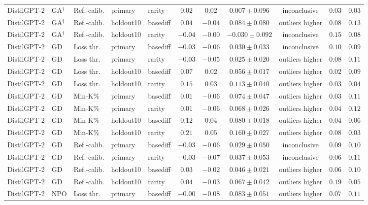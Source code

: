 {\begin{longtable}{@{\extracolsep{\fill}}lllllcccccc@{}}
DistilGPT-2 & GA$^{\dagger}$ & Ref.-calib. & primary & rarity & $0.02$ & $0.02$ & $0.007 \pm 0.096$ & inconclusive & $0.03$ & $0.03$ \\
DistilGPT-2 & GA$^{\dagger}$ & Ref.-calib. & holdout10 & basediff & $0.04$ & $-0.04$ & $0.084 \pm 0.080$ & outliers higher & $0.08$ & $0.13$ \\
DistilGPT-2 & GA$^{\dagger}$ & Ref.-calib. & holdout10 & rarity & $-0.04$ & $-0.00$ & $-0.030 \pm 0.092$ & inconclusive & $0.15$ & $0.08$ \\
DistilGPT-2 & GD & Loss thr. & primary & basediff & $-0.03$ & $-0.06$ & $0.030 \pm 0.033$ & inconclusive & $0.10$ & $0.09$ \\
DistilGPT-2 & GD & Loss thr. & primary & rarity & $-0.03$ & $-0.05$ & $0.025 \pm 0.020$ & outliers higher & $0.08$ & $0.11$ \\
DistilGPT-2 & GD & Loss thr. & holdout10 & basediff & $0.07$ & $0.02$ & $0.056 \pm 0.017$ & outliers higher & $0.02$ & $0.09$ \\
DistilGPT-2 & GD & Loss thr. & holdout10 & rarity & $0.15$ & $0.03$ & $0.113 \pm 0.040$ & outliers higher & $0.03$ & $0.04$ \\
DistilGPT-2 & GD & Min-K\% & primary & basediff & $0.01$ & $-0.06$ & $0.074 \pm 0.047$ & outliers higher & $0.03$ & $0.11$ \\
DistilGPT-2 & GD & Min-K\% & primary & rarity & $0.01$ & $-0.06$ & $0.068 \pm 0.026$ & outliers higher & $0.04$ & $0.12$ \\
DistilGPT-2 & GD & Min-K\% & holdout10 & basediff & $0.12$ & $0.04$ & $0.080 \pm 0.018$ & outliers higher & $0.04$ & $0.06$ \\
DistilGPT-2 & GD & Min-K\% & holdout10 & rarity & $0.21$ & $0.05$ & $0.160 \pm 0.027$ & outliers higher & $0.08$ & $0.03$ \\
DistilGPT-2 & GD & Ref.-calib. & primary & basediff & $-0.03$ & $-0.06$ & $0.029 \pm 0.050$ & inconclusive & $0.09$ & $0.10$ \\
DistilGPT-2 & GD & Ref.-calib. & primary & rarity & $-0.03$ & $-0.07$ & $0.037 \pm 0.053$ & inconclusive & $0.06$ & $0.11$ \\
DistilGPT-2 & GD & Ref.-calib. & holdout10 & basediff & $0.03$ & $-0.02$ & $0.046 \pm 0.021$ & outliers higher & $0.06$ & $0.10$ \\
DistilGPT-2 & GD & Ref.-calib. & holdout10 & rarity & $0.04$ & $-0.03$ & $0.067 \pm 0.042$ & outliers higher & $0.19$ & $0.05$ \\
DistilGPT-2 & NPO & Loss thr. & primary & basediff & $-0.00$ & $-0.08$ & $0.083 \pm 0.051$ & outliers higher & $0.07$ & $0.11$ \\

\end{longtable}}
